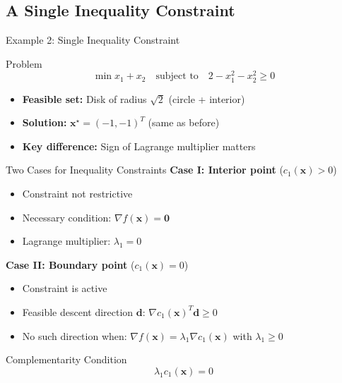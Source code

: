 \documentclass[aspectratio=1610]{beamer}
\begin{document}
\subsection{A Single Inequality Constraint}
\begin{frame}{Example 2: Single Inequality Constraint}
  \begin{block}{Problem}
    $$\min x_1 + x_2 \quad \text{subject to} \quad 2 - x_1^2 - x_2^2 \geq 0$$
  \end{block}
  
  \begin{itemize}
    \item \textbf{Feasible set:} Disk of radius $\sqrt{2}$ (circle + interior)
    \item \textbf{Solution:} $\mathbf{x}^{\star} = (-1, -1)^T$ (same as before)
    \item \textbf{Key difference:} Sign of Lagrange multiplier matters
  \end{itemize}
  
  \vspace{0.3cm}
\end{frame}

\begin{frame}{Two Cases for Inequality Constraints}
  \textbf{Case I: Interior point} ($c_1(\mathbf{x}) > 0$)
  \begin{itemize}
    \item Constraint not restrictive
    \item Necessary condition: $\nabla f(\mathbf{x}) = \mathbf{0}$
    \item Lagrange multiplier: $\lambda_1 = 0$
  \end{itemize}
  
  \vspace{0.5cm}
  \textbf{Case II: Boundary point} ($c_1(\mathbf{x}) = 0$)
  \begin{itemize}
    \item Constraint is active
    \item Feasible descent direction $\mathbf{d}$: $\nabla c_1(\mathbf{x})^T \mathbf{d} \geq 0$
    \item No such direction when: $\nabla f(\mathbf{x}) = \lambda_1 \nabla c_1(\mathbf{x})$ with $\lambda_1 \geq 0$
  \end{itemize}
  
  \vspace{0.5cm}
  \begin{block}{Complementarity Condition}
    $$\lambda_1 c_1(\mathbf{x}) = 0$$
  \end{block}
\end{frame}
\end{document}
